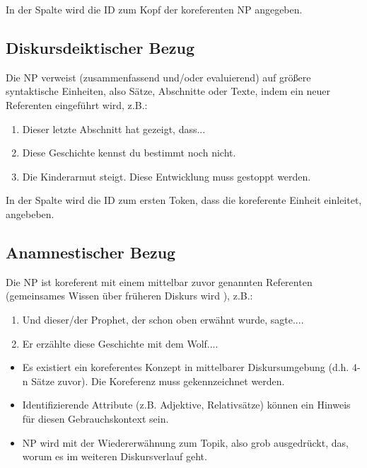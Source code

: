 {\noindent 
{} In der Spalte  wird die ID zum Kopf der koreferenten NP angegeben. 

\subsection{Diskursdeiktischer Bezug}

Die NP verweist (zusammenfassend und/oder evaluierend) auf größere syntaktische Einheiten, also Sätze, Abschnitte oder Texte, indem ein neuer Referenten eingeführt wird, z.B.: 

\begin{enumerate}
\item Dieser letzte Abschnitt hat gezeigt, dass...
\item Diese Geschichte kennst du bestimmt noch nicht. 
\item  Die Kinderarmut steigt. Diese Entwicklung muss gestoppt werden. 
\end{enumerate}

\noindent 
{} In der Spalte  wird die ID zum ersten Token, dass die koreferente Einheit einleitet, angebeben. 


\subsection{Anamnestischer Bezug}

Die NP ist koreferent mit einem mittelbar zuvor genannten Referenten (gemeinsames Wissen über früheren Diskurs wird ), z.B.:

\begin{enumerate}
\item Und dieser/der Prophet, der schon oben erwähnt wurde, sagte....  
\item Er erzählte diese Geschichte mit dem Wolf.... 
\end{enumerate}

\noindent 
{}
\begin{itemize}
\item Es existiert ein koreferentes Konzept in mittelbarer Diskursumgebung (d.h. 4-n Sätze zuvor). Die Koreferenz muss gekennzeichnet werden.
\item Identifizierende Attribute (z.B. Adjektive, Relativsätze) können ein Hinweis für diesen Gebrauchskontext sein.
\item NP wird mit der Wiedererwähnung zum Topik, also grob ausgedrückt, das, worum es im weiteren Diskursverlauf geht. 
\end{itemize}

}
